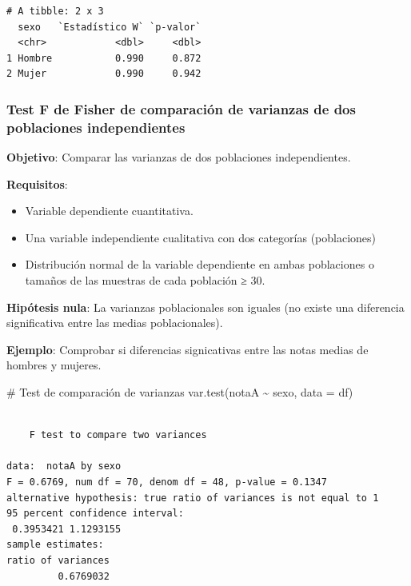 \documentclass[
  a4paper,
]{scrreport}
\newenvironment{Shaded}{\begin{snugshade}}{\end{snugshade}}
\newcommand{\AttributeTok}[1]{\textcolor[rgb]{0.40,0.45,0.13}{#1}}
\newcommand{\CommentTok}[1]{\textcolor[rgb]{0.37,0.37,0.37}{#1}}
\newcommand{\FunctionTok}[1]{\textcolor[rgb]{0.28,0.35,0.67}{#1}}
\newcommand{\NormalTok}[1]{\textcolor[rgb]{0.00,0.23,0.31}{#1}}
\newcommand{\SpecialCharTok}[1]{\textcolor[rgb]{0.37,0.37,0.37}{#1}}
\providecommand{\tightlist}{%
  \setlength{\itemsep}{0pt}\setlength{\parskip}{0pt}}\usepackage{longtable,booktabs,array}
\theoremstyle{definition}
\theoremstyle{definition}
\theoremstyle{remark}
\begin{document}
\begin{verbatim}
# A tibble: 2 x 3
  sexo   `Estadístico W` `p-valor`
  <chr>            <dbl>     <dbl>
1 Hombre           0.990     0.872
2 Mujer            0.990     0.942
\end{verbatim}

\hypertarget{test-f-de-fisher-de-comparaciuxf3n-de-varianzas-de-dos-poblaciones-independientes}{%
\subsubsection{Test F de Fisher de comparación de varianzas de dos
poblaciones
independientes}\label{test-f-de-fisher-de-comparaciuxf3n-de-varianzas-de-dos-poblaciones-independientes}}

\textbf{Objetivo}: Comparar las varianzas de dos poblaciones
independientes.

\textbf{Requisitos}:

\begin{itemize}
\tightlist
\item
  Variable dependiente cuantitativa.
\item
  Una variable independiente cualitativa con dos categorías
  (poblaciones)
\item
  Distribución normal de la variable dependiente en ambas poblaciones o
  tamaños de las muestras de cada población ≥ 30.
\end{itemize}

\textbf{Hipótesis nula}: La varianzas poblacionales son iguales (no
existe una diferencia significativa entre las medias poblacionales).

\textbf{Ejemplo}: Comprobar si diferencias signicativas entre las notas
medias de hombres y mujeres.

\begin{Shaded}
\begin{Highlighting}[]
\CommentTok{\# Test de comparación de varianzas}
\FunctionTok{var.test}\NormalTok{(notaA }\SpecialCharTok{\textasciitilde{}}\NormalTok{ sexo, }\AttributeTok{data =}\NormalTok{ df)}
\end{Highlighting}
\end{Shaded}

\begin{verbatim}

    F test to compare two variances

data:  notaA by sexo
F = 0.6769, num df = 70, denom df = 48, p-value = 0.1347
alternative hypothesis: true ratio of variances is not equal to 1
95 percent confidence interval:
 0.3953421 1.1293155
sample estimates:
ratio of variances 
         0.6769032 
\end{verbatim}
\end{document}
